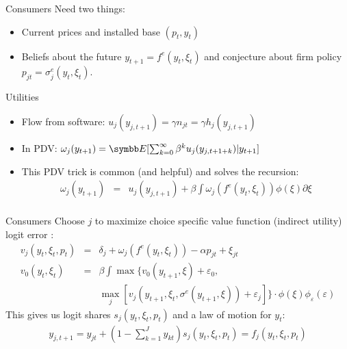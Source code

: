 \documentclass[aspectratio=169,11pt]{beamer}
\begin{document}
\begin{frame}{Consumers}
Need two things:
\begin{itemize}
\item Current prices and installed base $(p_t, y_t)$
\item Beliefs about the future $y_{t+1} = f^e(y_t,\xi_t)$ and conjecture about firm policy $p_{jt} = \sigma_j^e(y_t,\xi_t)$.
\end{itemize}
Utilities
\begin{itemize}
\item Flow from software: $u_j(y_{j,t+1}) = \gamma n_{jt} = \gamma h_j (y_{j,t+1})$
\item In PDV: $\omega_j (y_{t+1}) = \E [ \sum_{k=0}^{\infty} \beta^k u_j(y_{j,t+1+k}) | y_{t+1}]$
\item This PDV trick is common (and helpful) and solves the recursion:
\begin{eqnarray*}
\omega_j(y_{t+1}) &=& u_j(y_{j,t+1}) + \beta \int  \omega_j( f^e(y_t,\xi_t)) \phi(\xi) \partial \xi\\
\end{eqnarray*}
\end{itemize}
\end{frame}

\begin{frame}{Consumers}
Choose $j$ to maximize choice specific value function (indirect utility) logit error :
\begin{eqnarray*}
v_j (y_t,\xi_t,p_t) &=& \delta_j + \omega_j( f^e(y_t,\xi_t)) - \alpha p_{jt} + \xi_{jt}\\
v_0(y_t,\xi_t) &=& \beta \int \max\{ v_0(y_{t+1},\xi) + \varepsilon_0, \\
&&  \max_j [v_j (y_{t+1},\xi_t,\sigma^e(y_{t+1},\xi)) + \varepsilon_j ] \} \cdot \phi(\xi) \phi_{\varepsilon}(\varepsilon)
\end{eqnarray*}
This gives us logit shares $s_j(y_{t},\xi_{t},p_t)$ and a law of motion for $y_{t}$:
\begin{eqnarray*}
y_{j,t+1} = y_{jt} + (1-\sum_{k=1}^J y_{kt}) s_j(y_t,\xi_t, p_t) = f_j (y_t, \xi_t, p_t)
\end{eqnarray*}
\end{frame}
\end{document}

